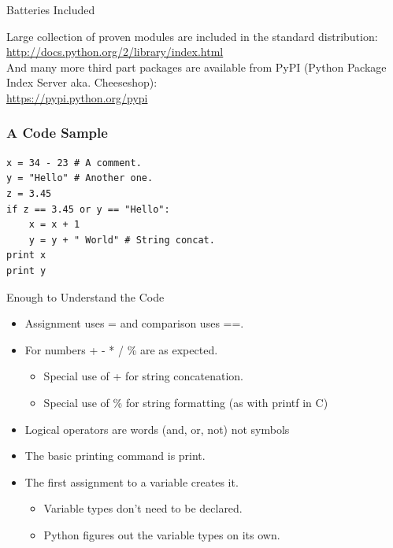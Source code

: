 \documentclass[12pt,handout]{beamer}
\begin{document}
\begin{frame}{Batteries Included}

Large collection of proven modules are included in the
standard distribution:
\\[.5cm]
\url{http://docs.python.org/2/library/index.html}
\\[.5cm]
And many more third part packages are available from PyPI
(Python Package Index Server aka. Cheeseshop):
\\[.5cm]
\url{https://pypi.python.org/pypi}

\end{frame}

\begin{frame}[fragile]
\frametitle{A Code Sample}

\small{
\begin{verbatim}
x = 34 - 23 # A comment.
y = "Hello" # Another one.
z = 3.45
if z == 3.45 or y == "Hello":
    x = x + 1
    y = y + " World" # String concat.
print x
print y
\end{verbatim}
}

\end{frame}

\begin{frame}{Enough to Understand the Code}

\begin{itemize}

\item Assignment uses = and comparison uses ==.
\item For numbers + - * / \% are as expected.
\begin{itemize}
\item Special use of + for string concatenation.
\item Special use of \% for string formatting (as with printf in C)
\end{itemize}
\item Logical operators are words (and, or, not)
not symbols
\item The basic printing command is print.
\item The first assignment to a variable creates it.
\begin{itemize}
\item Variable types don't need to be declared.
\item Python figures out the variable types on its own.
\end{itemize}

\end{itemize}

\end{frame}
\end{document}
